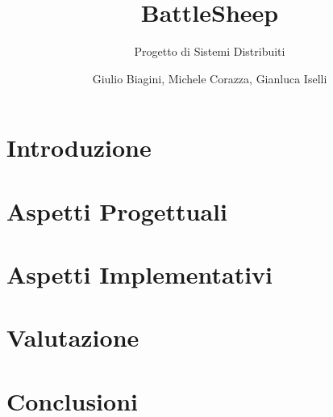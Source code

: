 \documentclass[a4paper,10pt]{scrartcl}
\begin{document}
\title{BattleSheep}
\subtitle{Progetto di Sistemi Distribuiti}
\author{Giulio Biagini, Michele Corazza, Gianluca Iselli}

\maketitle

\begin{abstract}

\end{abstract}

\section{Introduzione}


\section{Aspetti Progettuali}


\section{Aspetti Implementativi}





\section{Valutazione}


\section{Conclusioni}

\end{document}
